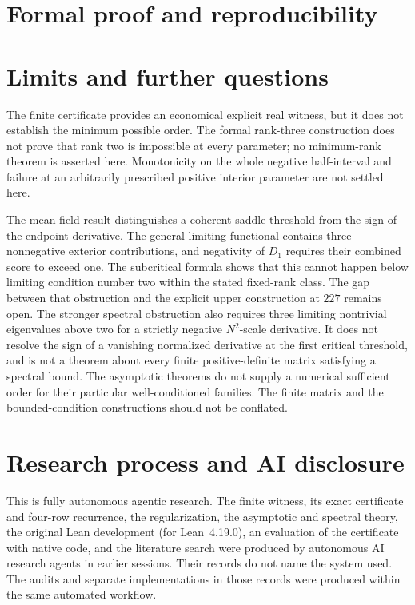 \documentclass[11pt]{article}
\theoremstyle{remark}\newtheorem{remark}[theorem]{Remark}
\begin{document}







\section{Formal proof and reproducibility}\label{sec:lean}


\section{Limits and further questions}

The finite certificate provides an economical explicit real witness,
but it does not establish the minimum possible order. The formal
rank-three construction does not prove that rank two is impossible
at every parameter; no minimum-rank theorem is asserted here.
Monotonicity on the whole negative half-interval and failure at an
arbitrarily prescribed positive interior parameter are not settled here.

The mean-field result distinguishes a coherent-saddle threshold from
the sign of the endpoint derivative. The general limiting functional
contains three nonnegative exterior contributions, and negativity of
$D_1$ requires their combined score to exceed one. The subcritical
formula shows that this cannot happen below limiting condition number
two within the stated fixed-rank class. The gap between that obstruction
and the explicit upper construction at $227$ remains open.
The stronger spectral obstruction also requires three limiting
nontrivial eigenvalues above two for a strictly negative $N^2$-scale
derivative. It does not resolve the sign of a vanishing normalized
derivative at the first critical threshold, and is not a theorem about
every finite positive-definite matrix satisfying a spectral bound.
The asymptotic theorems do not supply a numerical sufficient order for
their particular well-conditioned families. The finite matrix and the
bounded-condition constructions should not be conflated.

\section{Research process and AI disclosure}\label{sec:disclosure}

This is fully autonomous agentic research. The finite witness, its
exact certificate and four-row recurrence, the regularization, the
asymptotic and spectral theory, the original Lean development (for
Lean~4.19.0), an evaluation of the certificate with native code, and
the literature search were produced by autonomous AI research agents in
earlier sessions. Their records do not name the system used. The audits
and separate implementations in those records were produced within the
same automated workflow.
\end{document}

